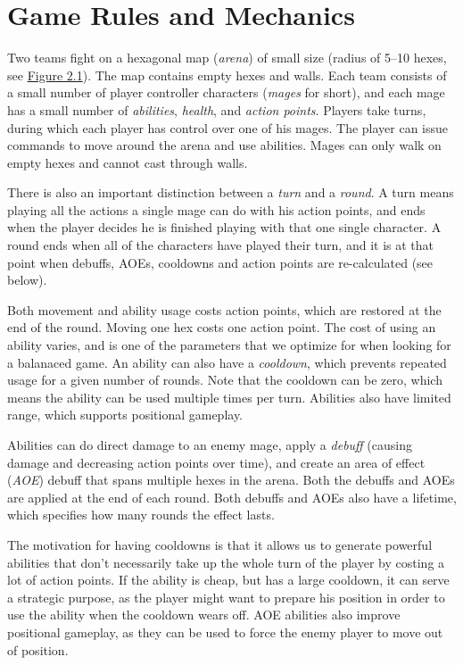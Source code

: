 \chapter{Game Rules and Mechanics}
\label{chapter02}

Two teams fight on a hexagonal map (\emph{arena}) of small size (radius of
5--10 hexes, see \hyperref[fig:arena]{Figure 2.1}). The map contains empty hexes and walls.
Each team consists of a small number of player controller
characters (\emph{mages} for short), and each mage has a small number of
\emph{abilities}, \emph{health}, and \emph{action points}. Players take turns, during
which each player has control over one of his mages. The player can issue
commands to move around the arena and use abilities. Mages can only walk on empty hexes
and cannot cast through walls.

There is also an important distinction between a \emph{turn} and a \emph{round}.
A turn means playing all the actions a single mage can do with his action points,
and ends when the player decides he is finished playing with that one single character.
A round ends when all of the characters have played their turn, and it is at that point
when debuffs, AOEs, cooldowns and action points are re-calculated (see below).

Both movement and ability usage costs action points, which are restored at the
end of the round. Moving one hex costs one action point. The cost of using an
ability varies, and is one of the parameters that we optimize for when looking
for a balanaced game. An ability can also have a \emph{cooldown}, which
prevents repeated usage for a given number of rounds. Note that the cooldown
can be zero, which means the ability can be used multiple times per turn.
Abilities also have limited range, which supports positional gameplay.

Abilities can do direct damage to an enemy mage, apply a \emph{debuff} (causing
damage and decreasing action points over time), and create an area of effect
(\emph{AOE}) debuff that spans multiple hexes in the arena. Both the debuffs and
AOEs are applied at the end of each round. Both debuffs and AOEs also have a lifetime,
which specifies how many rounds the effect lasts.

The motivation for having cooldowns is that it allows us to generate powerful
abilities that don't necessarily take up the whole turn of the player by costing
a lot of action points. If the ability is cheap, but has a large cooldown, it can
serve a strategic purpose, as the player might want to prepare his position in order
to use the ability when the cooldown wears off. AOE abilities also improve positional
gameplay, as they can be used to force the enemy player to move out of position.

